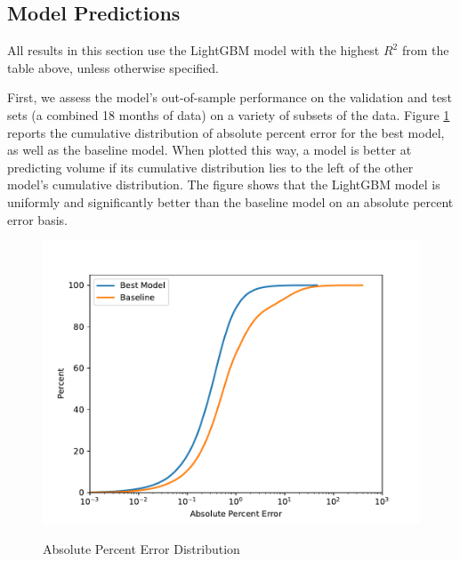 \documentclass[12pt]{article}
\begin{document}
\subsection{Model Predictions}
All results in this section use the LightGBM model with the highest $R^2$ from the table above, unless otherwise specified.

First, we assess the model's out-of-sample performance on the validation and test sets (a combined 18 months of data) on a variety of subsets of the data. Figure \ref{fig:absolute_percent_error_distribution} reports the cumulative distribution of absolute percent error for the best model, as well as the baseline model. When plotted this way, a model is better at predicting volume if its cumulative distribution lies to the left of the other model's cumulative distribution. The figure shows that the LightGBM model is uniformly and significantly better than the baseline model on an absolute percent error basis.

\begin{figure}[H]
    \centering
    \caption{Absolute Percent Error Distribution}
    \includegraphics[width=0.75\linewidth]{../Output/absolute_percent_error_distribution.pdf}
    \label{fig:absolute_percent_error_distribution}
\end{figure}
\end{document}
